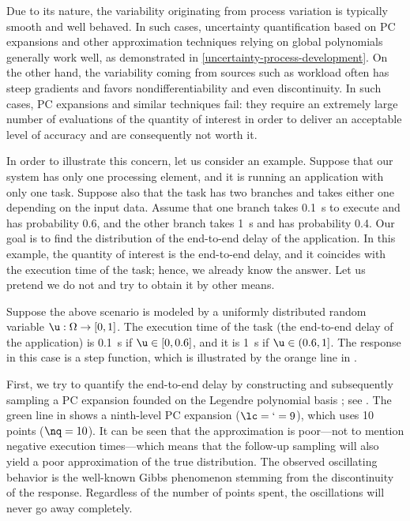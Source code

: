 Due to its nature, the variability originating from process variation is
typically smooth and well behaved. In such cases, uncertainty quantification
based on \ac{PC} expansions \cite{xiu2010} and other approximation techniques
relying on global polynomials generally work well, as demonstrated in
\cref{uncertainty-process-development}. On the other hand, the variability
coming from sources such as workload often has steep gradients and favors
nondifferentiability and even discontinuity. In such cases, \ac{PC} expansions
and similar techniques fail: they require an extremely large number of
evaluations of the quantity of interest in order to deliver an acceptable level
of accuracy and are consequently not worth it.

In order to illustrate this concern, let us consider an example. Suppose that
our system has only one processing element, and it is running an application
with only one task. Suppose also that the task has two branches and takes either
one depending on the input data. Assume that one branch takes 0.1~s to execute
and has probability 0.6, and the other branch takes 1~s and has probability 0.4.
Our goal is to find the distribution of the end-to-end delay of the application.
In this example, the quantity of interest is the end-to-end delay, and it
coincides with the execution time of the task; hence, we already know the
answer. Let us pretend we do not and try to obtain it by other means.

Suppose the above scenario is modeled by a uniformly distributed random variable
$\u: \Omega \to [0, 1]$. The execution time of the task (the end-to-end delay of
the application) is 0.1~s if $\u \in [0, 0.6]$, and it is 1~s if $\u \in (0.6,
1]$. The response in this case is a step function, which is illustrated by the
orange line in .

First, we try to quantify the end-to-end delay by constructing and subsequently
sampling a \ac{PC} expansion founded on the Legendre polynomial basis
\cite{xiu2010}; see . The green line in
 shows a ninth-level \ac{PC} expansion ($\lc = \lq = 9$),
which uses 10 points ($\nq = 10$). It can be seen that the approximation is
poor---not to mention negative execution times---which means that the follow-up
sampling will also yield a poor approximation of the true distribution. The
observed oscillating behavior is the well-known Gibbs phenomenon stemming from
the discontinuity of the response. Regardless of the number of points spent, the
oscillations will never go away completely.


